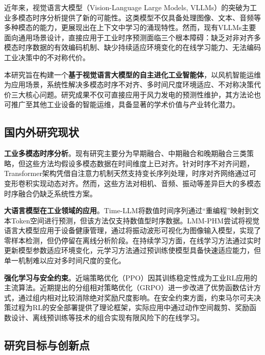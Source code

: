 \documentclass[12pt,a4paper]{article}
\begin{document}
近年来，视觉语言大模型（Vision-Language Large Models, VLLMs）的突破为工业多模态时序分析提供了新的可能性。这类模型不仅具备处理图像、文本、音频等多种模态的能力，更展现出在上下文中学习的涌现特性。然而，现有VLLMs主要面向通用场景设计，直接应用于工业时序预测面临三个根本障碍：缺乏对非对齐多模态时序数据的有效编码机制、缺少持续适应环境变化的在线学习能力、无法编码工业决策中的不对称代价。

本研究旨在构建一个\textbf{基于视觉语言大模型的自主进化工业智能体}，以风机智能运维为应用场景，系统性解决多模态时序不对齐、多时间尺度环境适应、不对称决策代价三大核心问题。研究成果不仅可直接应用于风力发电的预测性维护，其方法论也可推广至其他工业设备的智能运维，具备显著的学术价值与产业转化潜力。

\subsection{国内外研究现状}

\textbf{工业多模态时序分析}。现有研究主要分为早期融合、中期融合和晚期融合三类策略\cite{baltrusaitis2019multimodal}，但这些方法均假设多模态数据在时间维度上已对齐。针对时序不对齐问题，Transformer架构凭借自注意力机制天然支持变长序列处理\cite{vaswani2017attention}，时序对齐网络通过可变形卷积实现动态对齐\cite{su2021temporal}。然而，这些方法对相机、音频、振动等差异巨大的多模态时序融合仍缺乏系统性方案。

\textbf{大语言模型在工业领域的应用}。Time-LLM将数值时间序列通过“重编程”映射到文本Token空间进行预测\cite{jin2024time}，但该方法仅支持数值型时序数据。LMM-PHM尝试将视觉语言大模型应用于设备健康管理\cite{li2024lmm}，通过将振动波形可视化为图像输入模型，实现了零样本检测，但仍停留在离线分析阶段。在持续学习方面，在线学习方法通过实时更新模型参数适应环境变化\cite{cesa2006prediction}，元学习方法通过预训练使模型具备快速适应能力\cite{finn2017model}，但单一机制难以应对多时间尺度的变化。

\textbf{强化学习与安全约束}。近端策略优化（PPO）因其训练稳定性成为工业RL应用的主流算法\cite{schulman2017proximal}。近期提出的分组相对策略优化（GRPO）进一步改进了优势函数估计方式\cite{shao2024deepseekmath}，通过组内相对比较消除绝对奖励尺度影响。在安全约束方面，约束马尔可夫决策过程为RL的安全部署提供了理论框架\cite{altman1999constrained}，实际应用中通过动作空间裁剪、奖励函数设计、离线预训练等技术的组合实现有限风险下的在线学习\cite{garcia2015comprehensive}。

\subsection{研究目标与创新点}
\end{document}
